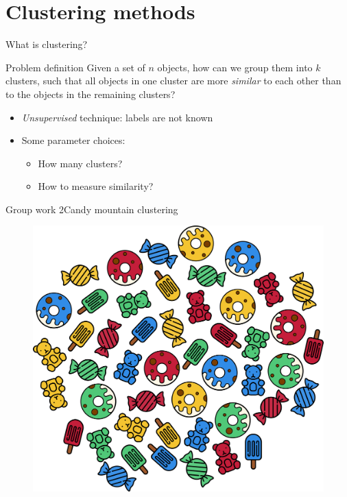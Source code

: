 \documentclass[aspectratio=169]{beamer}
\begin{document}
  \section{Clustering methods}

  \begin{frame}{What is clustering?}

    \begin{block}{Problem definition}
      Given a set of $n$ objects, how can we group them into $k$
      clusters, such that all objects in one cluster are more
      \emph{similar} to each other than to the objects in the
      remaining clusters?
    \end{block}

    \vfill

    \begin{itemize}
      \item \emph{Unsupervised} technique: labels are not known
      \item Some parameter choices:
        \begin{itemize}
          \item How many clusters?
          \item How to measure similarity?
        \end{itemize}
    \end{itemize}
  \end{frame}

  \begin{frame}{Group work 2}{Candy mountain clustering}
    \begin{figure}
      \includegraphics[width=0.50\linewidth]{Figures/Candy_mountain}
    \end{figure}
  \end{frame}
\end{document}
